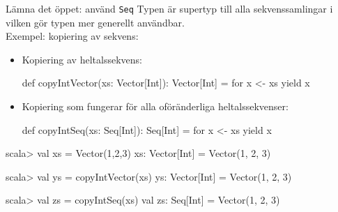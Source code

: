 \begin{Slide}{Lämna det öppet: använd \texttt{Seq}}\SlideFontSmall
Typen  är supertyp till alla sekvenssamlingar i\\ vilken gör typen  mer generellt användbar.\\
\pause Exempel: kopiering av sekvens:
\begin{itemize}
\item Kopiering av  heltalssekvens:
\begin{Code}
def copyIntVector(xs: Vector[Int]): Vector[Int] = for x <- xs yield x
\end{Code}

\item Kopiering som fungerar för alla oföränderliga heltalssekvenser:
\begin{Code}
def copyIntSeq(xs: Seq[Int]): Seq[Int] = for x <- xs yield x
\end{Code}
\end{itemize}
\pause
\begin{REPL}
scala> val xs = Vector(1,2,3)
xs: Vector[Int] = Vector(1, 2, 3)

scala> val ys = copyIntVector(xs)
ys: Vector[Int] = Vector(1, 2, 3)

scala> val zs = copyIntSeq(xs)
val zs: Seq[Int] = Vector(1, 2, 3)
\end{REPL}
%
%
\end{Slide}
  
